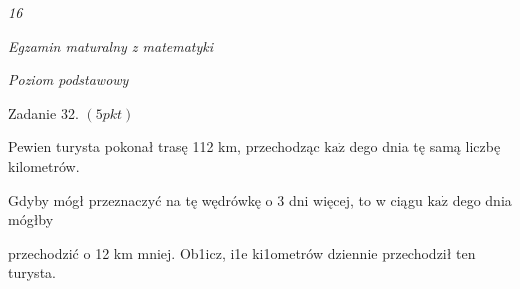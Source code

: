 \documentclass[a4paper,12pt]{article}
\begin{document}
{\it 16}

{\it Egzamin maturalny z matematyki}

{\it Poziom podstawowy}

Zadanie 32. $(5pkt)$

Pewien turysta pokonał trasę 112 km, przechodząc $\mathrm{k}\mathrm{a}\dot{\mathrm{z}}$ dego dnia tę samą liczbę kilometrów.

Gdyby mógł przeznaczyć na tę wędrówkę o 3 dni więcej, to w ciągu $\mathrm{k}\mathrm{a}\dot{\mathrm{z}}$ dego dnia mógłby

przechodzić o 12 km mniej. Ob1icz, i1e ki1ometrów dziennie przechodził ten turysta.
\end{document}
